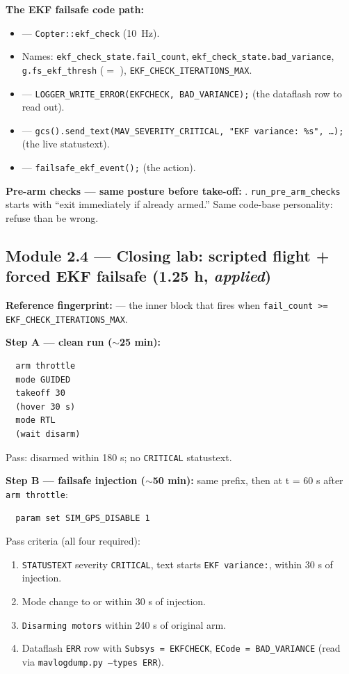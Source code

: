 \documentclass[a4paper,11pt,twoside]{article}
\begin{document}
\textbf{The EKF failsafe code path:}
\begin{itemize}
  \item {} --- \texttt{Copter::ekf\_check} (10~Hz).
  \item Names: \texttt{ekf\_check\_state.fail\_count}, \texttt{ekf\_check\_state.bad\_variance}, \texttt{g.fs\_ekf\_thresh} ($=$ ), \texttt{EKF\_CHECK\_ITERATIONS\_MAX}.
  \item {} --- \texttt{LOGGER\_WRITE\_ERROR(EKFCHECK, BAD\_VARIANCE);} (the dataflash row to read out).
  \item {} --- \texttt{gcs().send\_text(MAV\_SEVERITY\_CRITICAL, "EKF variance: \%s", \dots);} (the live statustext).
  \item {} --- \texttt{failsafe\_ekf\_event();} (the action).
\end{itemize}

\textbf{Pre-arm checks --- same posture before take-off:} . \texttt{run\_pre\_arm\_checks} starts with ``exit immediately if already armed.'' Same code-base personality: refuse than be wrong.

\subsection{Module 2.4 --- Closing lab: scripted flight + forced EKF failsafe (1.25 h, \emph{applied})}

\textbf{Reference fingerprint:}  --- the inner block that fires when \texttt{fail\_count >= EKF\_CHECK\_ITERATIONS\_MAX}.

\textbf{Step A --- clean run ($\sim$25 min):}
\begin{verbatim}
  arm throttle
  mode GUIDED
  takeoff 30
  (hover 30 s)
  mode RTL
  (wait disarm)
\end{verbatim}
Pass: disarmed within 180 s; no \texttt{CRITICAL} statustext.

\textbf{Step B --- failsafe injection ($\sim$50 min):} same prefix, then at t = 60 s after \texttt{arm throttle}:
\begin{verbatim}
  param set SIM_GPS_DISABLE 1
\end{verbatim}
Pass criteria (all four required):
\begin{enumerate}
  \item \texttt{STATUSTEXT} severity \texttt{CRITICAL}, text starts \texttt{EKF variance:}, within 30 s of injection.
  \item Mode change to  or  within 30 s of injection.
  \item \texttt{Disarming motors} within 240 s of original arm.
  \item Dataflash \texttt{ERR} row with \texttt{Subsys = EKFCHECK}, \texttt{ECode = BAD\_VARIANCE} (read via \texttt{mavlogdump.py --types ERR}).
\end{enumerate}
\end{document}
